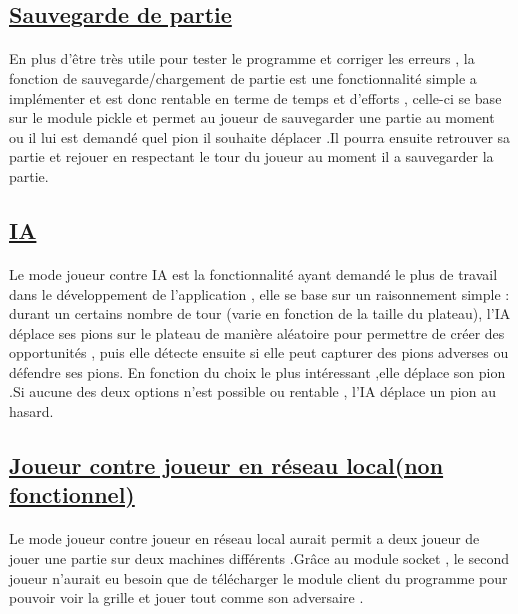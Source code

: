\documentclass[a4paper,12pt]{article}
\begin{document}
\subsection{\underline{Sauvegarde de partie}}
\paragraph{}
En plus d'être très utile  pour tester le programme et corriger les erreurs , la fonction de sauvegarde/chargement de partie est une fonctionnalité simple a implémenter et est donc rentable en terme de temps et d'efforts , celle-ci se base sur le module pickle et permet au joueur de sauvegarder une partie au moment ou il lui est demandé quel pion il souhaite déplacer .Il pourra ensuite retrouver sa partie et rejouer en respectant le tour du joueur au moment il a sauvegarder la partie.
\newpage
\subsection{\underline{IA}}
\paragraph{}
Le mode joueur contre IA est la fonctionnalité ayant demandé le plus de travail dans le développement de l'application , elle se base sur un raisonnement simple : durant un certains nombre de tour (varie en fonction de la taille du plateau), l'IA déplace ses pions sur le plateau de manière aléatoire pour permettre de créer des opportunités , puis elle détecte ensuite si elle peut capturer des pions adverses ou défendre ses pions. En fonction du choix le plus intéressant ,elle déplace son pion .Si aucune des deux options n'est possible ou rentable , l'IA déplace un pion au hasard.

\subsection{\underline{Joueur contre joueur en réseau local(non fonctionnel)}}
\paragraph{}
Le mode joueur contre joueur en réseau local aurait permit a deux joueur de jouer une partie sur deux machines différents .Grâce au module socket , le second joueur n'aurait eu besoin que de télécharger le module client du programme pour pouvoir voir la grille et jouer tout comme son adversaire .
\end{document}
